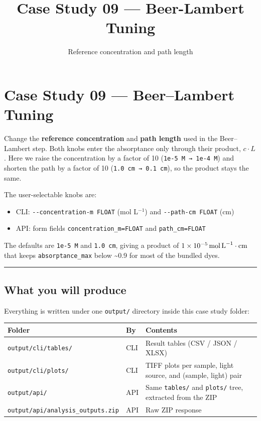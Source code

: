\documentclass[
  11pt,
]{article}
\title{Case Study 09 — Beer-Lambert Tuning}
\subtitle{Reference concentration and path length}
\author{}
\date{}
\providecommand{\tightlist}{
  \setlength{\itemsep}{0pt}\setlength{\parskip}{0pt}}
\begin{document}
\maketitle

{
\hypersetup{linkcolor=}
\setcounter{tocdepth}{2}
\tableofcontents
}
\hypertarget{case-study-09--beerlambert-tuning}{
\section{Case Study 09 --- Beer--Lambert
Tuning}\label{case-study-09--beerlambert-tuning}}

Change the \textbf{reference concentration} and \textbf{path length}
used in the Beer--Lambert step. Both knobs enter the absorptance only
through their product, \(c\cdot L\). Here we raise the concentration
by a factor of 10 (\texttt{1e-5\ M\ →\ 1e-4\ M}) and shorten the path by
a factor of 10 (\texttt{1.0\ cm\ →\ 0.1\ cm}), so the product stays the
same.

The user-selectable knobs are:

\begin{itemize}
\tightlist
\item
  CLI: \texttt{-\/-concentration-m\ FLOAT} (mol L\(^{-1}\)) and
  \texttt{-\/-path-cm\ FLOAT} (cm)
\item
  API: form fields \texttt{concentration\_m=FLOAT} and
  \texttt{path\_cm=FLOAT}
\end{itemize}

The defaults are \texttt{1e-5\ M} and \texttt{1.0\ cm}, giving a product
of \(1\times 10^{-5}\,\text{mol\,L}^{-1}\cdot\text{cm}\) that keeps
\texttt{absorptance\_max} below \textasciitilde0.9 for most of the
bundled dyes.

\begin{center}\rule{0.5\linewidth}{0.5pt}\end{center}

\hypertarget{what-you-will-produce}{
\subsection{What you will produce}\label{what-you-will-produce}}

Everything is written under one \texttt{output/} directory inside this
case study folder:

\begin{longtable}[]{@{}lll@{}}
\toprule
Folder & By & Contents \\
\midrule
\endhead
\texttt{output/cli/tables/} & CLI & Result tables (CSV / JSON / XLSX) \\
\texttt{output/cli/plots/} & CLI & TIFF plots per sample, light source,
and (sample, light) pair \\
\texttt{output/api/} & API & Same \texttt{tables/} and \texttt{plots/}
tree, extracted from the ZIP \\
\texttt{output/api/analysis\_outputs.zip} & API & Raw ZIP response \\
\bottomrule
\end{longtable}
\end{document}

